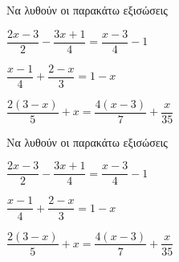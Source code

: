 Να λυθούν οι παρακάτω εξισώσεις
\begin{rlist}
\item $ \dfrac{2x-3}{2}-\dfrac{3x+1}{4}=\dfrac{x-3}{4}-1 $
\item $ \dfrac{x-1}{4}+\dfrac{2-x}{3}=1-x $
\item $ \dfrac{2(3-x)}{5}+x=\dfrac{4(x-3)}{7}+\dfrac{x}{35} $
\end{rlist}
Να λυθούν οι παρακάτω εξισώσεις
\begin{rlist}
\item $ \dfrac{2x-3}{2}-\dfrac{3x+1}{4}=\dfrac{x-3}{4}-1 $
\item $ \dfrac{x-1}{4}+\dfrac{2-x}{3}=1-x $
\item $ \dfrac{2(3-x)}{5}+x=\dfrac{4(x-3)}{7}+\dfrac{x}{35} $
\end{rlist}
